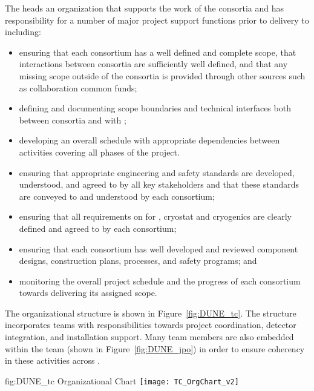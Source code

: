 The  heads an organization that supports the work of 
the consortia and has responsibility for a number of major project 
support functions prior to delivery to  including:
\begin{itemize}
\item ensuring that each consortium has a well defined and complete
  scope, that interactions between consortia are sufficiently 
  well defined, and that any missing scope outside of the 
  consortia is provided through other sources such as collaboration
  common funds;
\item defining and documenting scope boundaries and technical 
  interfaces both between consortia and with ;  
\item developing an overall schedule with appropriate dependencies
  between activities covering all phases of the project. 
\item ensuring that appropriate engineering and safety standards 
  are developed, understood, and agreed to by all key stakeholders 
  and that these standards are conveyed to and understood by each
  consortium;
\item ensuring that all  requirements on  
  for , cryostat and cryogenics are clearly defined and 
  agreed to by each consortium;
\item ensuring that each consortium has well developed and reviewed
  component designs, construction plans,  processes, and 
  safety programs; and
\item monitoring the overall project schedule and the progress of 
  each consortium towards delivering its assigned scope. 
\end{itemize}

The   organizational structure is shown 
in Figure~\ref{fig:DUNE_tc}.  The structure incorporates teams 
with responsibilities towards project coordination, detector 
integration, and installation support.  Many  team 
members are also embedded within the  team (shown 
in Figure~\ref{fig:DUNE_jpo}) in order to ensure coherency in 
these activities across .
\begin{dunefigure}{fig:DUNE_tc}
  {  Organizational Chart}
  \texttt{[image: TC\_OrgChart\_v2]}
\end{dunefigure}
 
